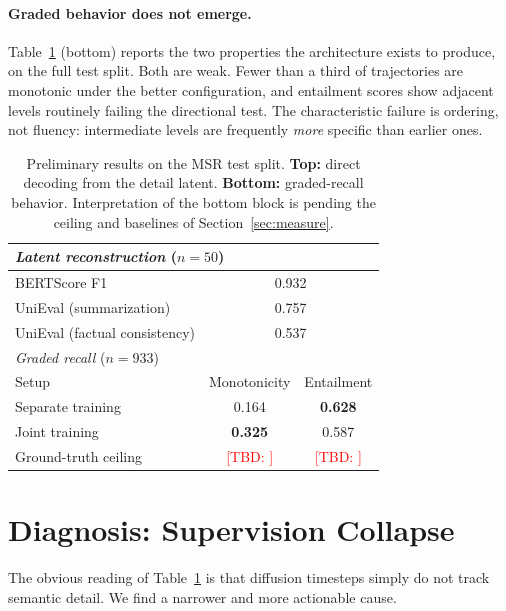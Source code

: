 \documentclass{article}
\newcommand{\tbd}[1]{\textcolor{red}{[TBD: #1]}}
\begin{document}
\paragraph{Graded behavior does not emerge.}
Table~\ref{tab:results} (bottom) reports the two properties the architecture exists to produce, on the full test split. Both are weak. Fewer than a third of trajectories are monotonic under the better configuration, and entailment scores show adjacent levels routinely failing the directional test. The characteristic failure is ordering, not fluency: intermediate levels are frequently \emph{more} specific than earlier ones.

\begin{table}[h]
  \centering
  \small
  \caption{Preliminary results on the MSR test split. \textbf{Top:} direct decoding from the detail latent. \textbf{Bottom:} graded-recall behavior. Interpretation of the bottom block is pending the ceiling and baselines of Section~\ref{sec:measure}.}
  \label{tab:results}
  \begin{tabular}{lcc}
    \toprule
    \multicolumn{3}{l}{\emph{Latent reconstruction} ($n{=}50$)} \\
    \midrule
    BERTScore F1                  & \multicolumn{2}{c}{0.932} \\
    UniEval (summarization)       & \multicolumn{2}{c}{0.757} \\
    UniEval (factual consistency) & \multicolumn{2}{c}{0.537} \\
    \midrule
    \multicolumn{3}{l}{\emph{Graded recall} ($n{=}933$)} \\
    \midrule
    Setup             & Monotonicity   & Entailment \\
    Separate training & 0.164          & \textbf{0.628} \\
    Joint training    & \textbf{0.325} & 0.587 \\
    \midrule
    Ground-truth ceiling & \tbd{} & \tbd{} \\
    \bottomrule
  \end{tabular}
\end{table}

\section{Diagnosis: Supervision Collapse}
\label{sec:diagnosis}

The obvious reading of Table~\ref{tab:results} is that diffusion timesteps simply do not track semantic detail. We find a narrower and more actionable cause.
\end{document}
